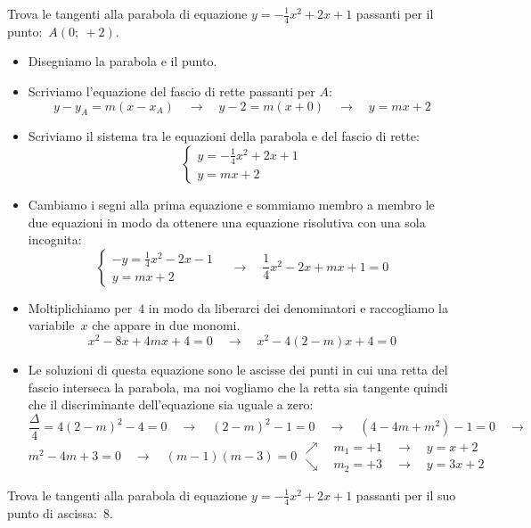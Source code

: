 \begin{exrig}

\begin{esempio}
 Trova le tangenti alla parabola di equazione $y=-\frac{1}{4}x^2+2x +1$ 
 passanti per il punto:~$A(0;~+2)$.
 
 \begin{itemize}
  \item Disegniamo la parabola e il punto.
  \item Scriviamo l'equazione del fascio di rette passanti per $A$:
\[y-y_A = m(x-x_A) \quad \rightarrow \quad 
y-2 = m\left(x+0\right)
\quad \rightarrow \quad y=mx+2\]
  \item Scriviamo il sistema tra le equazioni della parabola e del fascio di 
   rette:
\[\left\{\begin{array}{l}
  y=-\frac{1}{4}x^2+2x +1\\
  y=mx+2
\end{array}\right. \]
  \item Cambiamo i segni alla prima equazione e sommiamo membro a membro le
   due equazioni in modo da ottenere una equazione risolutiva con una sola 
   incognita:
\[\left\{\begin{array}{l}
  -y=\frac{1}{4}x^2-2x-1\\
  y=mx+2
\end{array}\right. \quad \rightarrow \quad 
\frac{1}{4}x^2-2x+mx+1=0\]
  \item Moltiplichiamo per~$4$ in modo da liberarci dei denominatori e 
   raccogliamo la variabile~$x$ che appare in due monomi.
\[x^2-8x+4mx+4=0 \quad \rightarrow \quad x^2-4(2-m)x+4=0\]
  \item Le soluzioni di questa equazione sono le ascisse dei punti in cui una 
   retta del fascio interseca la parabola, ma noi vogliamo che la retta sia
   tangente quindi che il discriminante dell'equazione sia uguale a zero:
\[\frac{\Delta}{4}=4(2-m)^2-4=0 \quad \rightarrow \quad 
(2-m)^2-1=0 \quad \rightarrow \quad
(4-4m+m^2)-1=0 \quad \rightarrow \quad\]
\[m^2-4m+3=0 \quad \rightarrow \quad
(m-1)(m-3)=0 
 \begin{array}{l}
  \nearrow \quad m_1=+1 \quad \rightarrow \quad y=x+2\\
  \searrow \quad m_2=+3 \quad \rightarrow \quad y=3x+2
 \end{array}\]
 \end{itemize}
\end{esempio}

\begin{esempio}
 Trova le tangenti alla parabola di equazione $y=-\frac{1}{4}x^2+2x +1$ 
 passanti per il suo punto di ascissa:~$8$.
 

\end{esempio}
\end{exrig}
